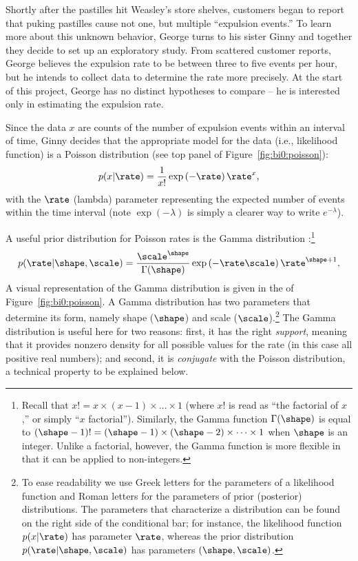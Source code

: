 Shortly after the pastilles hit Weasley's store shelves, customers began to report that puking pastilles cause not one, but multiple ``expulsion events.''  To learn more about this unknown behavior, George turns to his sister Ginny and together they decide to set up an exploratory study.  From scattered customer reports, George believes the expulsion rate to be between three to five events per hour, but he intends to collect data to determine the rate more precisely.  At the start of this project, George has no distinct hypotheses to compare -- he is interested only in estimating the expulsion rate.

Since the data $x$ are counts of the number of expulsion events within an interval of time, Ginny decides that the appropriate model for the data (i.e., likelihood function) is a Poisson distribution {(see top panel of Figure~\ref{fig:bi0:poisson})}:
\begin{equation}\label{eq:poisson}
p(x|\rate) = \frac{1}{x!} \exp\left(-\rate\right) \rate^x,
\end{equation}
with the $\rate$ (lambda) parameter representing the expected number of events within the time interval (note $\exp(-\lambda)$ is simply a clearer way to write $e^{-\lambda}$). 

{A} useful prior distribution for Poisson rates is the Gamma distribution {\cite[Appendix~A]{GelmanEtAl2004}}:\footnote{Recall that $x!=x\times (x-1) \times \dots\times 1$ (where $x!$ is read as ``the factorial of $x$,'' or simply ``$x$ factorial''). Similarly, the Gamma function $\Gamma(\shape)$ is equal to $(\shape-1)!=(\shape-1)\times(\shape-2)\times\dots\times 1$ when $\shape$ is an integer. Unlike a factorial, however, the Gamma function is more flexible in that it can be applied to non-integers.}
\begin{equation}\label{eq:gamma}
p(\rate|\shape,\scale) = \frac{\scale^\shape}{\Gamma(\shape)} \exp\left(-\rate \scale\right) \rate^{\shape + 1},
\end{equation}
A visual representation of  {the Gamma} distribution is given in the  of Figure~\ref{fig:bi0:poisson}. {A Gamma distribution has two parameters that determine its form, namely shape ($\shape$) and scale ($\scale$).\footnote{To ease readability we use Greek letters for the parameters of a likelihood function and Roman letters for the parameters of prior (posterior) distributions. The parameters that characterize a distribution can be found on the right side of the conditional bar; for instance, the likelihood function $p(x|\rate)$ has parameter $\rate$, whereas the prior distribution $p(\rate|\shape,\scale)$ has parameters $(\shape,\scale)$.} 
}
The Gamma distribution is useful here for two reasons: first, it has the right \emph{support}, meaning that it provides nonzero density for all possible values for the rate (in this case all positive real numbers); and second, it is \emph{conjugate} with the Poisson distribution, a technical property to be explained below.

